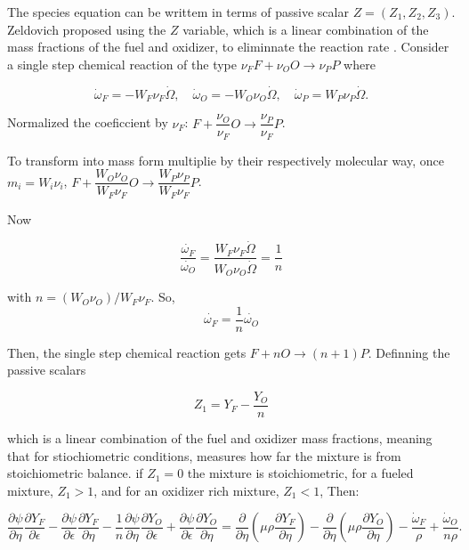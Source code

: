 The species equation can be writtem in terms  of 
passive scalar  
$Z=(Z_1,Z_2,Z_3)$. 
Zeldovich proposed using the $Z$ variable, 
which is a linear combination of the
mass fractions of the fuel and oxidizer, to eliminnate 
the reaction rate . 
Consider a single step chemical reaction of the type $\nu_F F+\nu_OO \rightarrow \nu_P P$
where  

\begin{equation}
\dot{\omega}_F=-W_F\nu_F\dot{\Omega}
,
\quad              
\dot{\omega}_O=-W_O\nu_O\dot{\Omega}
,
\quad              
\dot{\omega}_P= W_P\nu_P\dot{\Omega}
.
\end{equation}

Normalized the coeficcient by $\nu_F$: 
$F+\dfrac{\nu_O}{\nu_F}O \rightarrow \dfrac{\nu_P}{\nu_F} P$. 

To transform into mass form multiplie by 
their respectively molecular way, once  $m_i=W_i\nu_i$,   
$F+\dfrac{W_O\nu_O}{W_F\nu_F}O \rightarrow \dfrac{W_P\nu_P}{W_F\nu_F} P$. 

Now  

\begin{equation}
    \frac{\dot{\omega_F}}{\dot{\omega_O}}
    =
    \frac{W_F\nu_F\dot{\Omega}}{W_O\nu_O\dot{\Omega}}
    =
    \frac{1}{n} 
\end{equation}

with $n=(W_O\nu_O)/W_F\nu_F$.
So,  
\begin{equation}
    \dot{\omega_F}=\frac{1}{n}{\dot{\omega_O}}
\end{equation}

Then, the single step chemical reaction gets  $F + n O \rightarrow (n+1)P$. 
Definning the passive scalars

\begin{equation}
Z_1=
Y_F
-
\frac{Y_O}{n}
\end{equation}          

which is a linear combination of the fuel and oxidizer mass fractions, 
meaning that for stiochiometric conditions, 
measures how far the mixture is from stoichiometric balance.
if $Z_1=0$ the mixture is stoichiometric, for a 
fueled mixture, $Z_1>1$, and for an oxidizer rich mixture, $Z_1<1$, 
Then:

\begin{equation} 
\frac{\partial \psi}{\partial \eta}
\frac{\partial Y_{F}}{\partial \epsilon}
-
\frac{\partial \psi}{\partial \epsilon}
\frac{\partial Y_{F}}{\partial \eta}
-
\frac{1}{n}
\frac{\partial \psi}{\partial \eta}
\frac{\partial Y_{O}}{\partial \epsilon}
+
\frac{\partial \psi}{\partial \epsilon}
\frac{\partial Y_{O}}{\partial \eta}
=
\frac{\partial}{\partial \eta}
\left(\mu\rho \frac{\partial Y_F}{\partial \eta}\right)
-
\frac{\partial}{\partial \eta}
\left(\mu\rho \frac{\partial Y_O}{\partial \eta}\right)
-
\frac{\dot{\omega}_F}{\rho}
+
\frac{\dot{\omega}_O}{n\rho}
.
\end{equation} 

